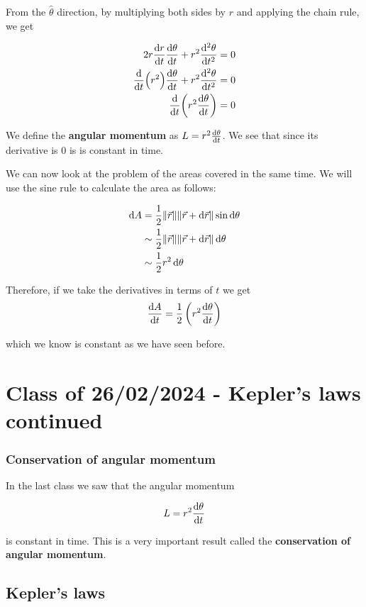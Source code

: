\documentclass[10pt]{extarticle}
\begin{document}
From the $\hat \theta$ direction, by multiplying both sides by $r$ and applying the chain rule, we get

\begin{align*}
    2 r \dv{r}{t} \dv{\theta}{t} + r^2 \dv[2]{\theta}{t} & = 0 \\
    \dv{t}(r^2) \dv{\theta}{t} + r^2 \dv[2]{\theta}{t}   & = 0 \\
    \dv{t}(r^2 \dv{\theta}{t})                           & = 0
\end{align*}

We define the \textbf{angular momentum} as $L = r^2 \dv{\theta}{t}$.
We see that since its derivative is 0 is is constant in time.

We can now look at the problem of the areas covered in the same time.
We will use the sine rule to calculate the area as follows:

\begin{align*}
    \dd{A} & = \frac{1}{2} \norm{\vec r} \norm{\vec{r} + \dd{\vec{r}}} \sin \dd{\theta} \\
           & \sim \frac{1}{2} \norm{\vec r} \norm{\vec{r} + \dd{\vec{r}}} \dd{\theta}   \\
           & \sim \frac{1}{2} r^2 \dd{\theta}                                           \\
\end{align*}

Therefore, if we take the derivatives in terms of $t$ we get
$$
    \dv{A}{t} = \frac{1}{2} \left(r^2 \dv{\theta}{t}\right)
$$

which we know is constant as we have seen before.

\section{Class of 26/02/2024 - Kepler's laws continued}

\subsubsection{Conservation of angular momentum}

In the last class we saw that the angular momentum

$$
    L = r^2 \dv{\theta}{t}
$$

is constant in time. This is a very important result called the \textbf{conservation of angular momentum}.

\subsection{Kepler's laws}
\end{document}
